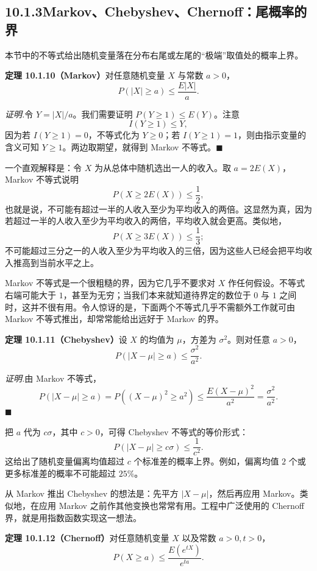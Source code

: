 \documentclass[UTF8,12pt,a4paper,fontset=fandol]{ctexart}
\begin{document}
\subsection*{10.1.3\quad Markov、Chebyshev、Chernoff：尾概率的界}

本节中的不等式给出随机变量落在分布右尾或左尾的“极端”取值处的概率上界。

\noindent\textbf{定理 10.1.10（Markov）}\quad 对任意随机变量 $X$ 与常数 $a>0$，
\[
  P(|X|\ge a)\le \frac{E|X|}{a}.
\]

\noindent\textit{证明.}\quad 令 $Y=|X|/a$。我们需要证明 $P(Y\ge 1)\le E(Y)$。注意
\[
  I(Y\ge 1)\le Y,
\]
因为若 $I(Y\ge 1)=0$，不等式化为 $Y\ge 0$；若 $I(Y\ge 1)=1$，则由指示变量的含义可知 $Y\ge 1$。两边取期望，就得到 Markov 不等式。$\blacksquare$

一个直观解释是：令 $X$ 为从总体中随机选出一人的收入。取 $a=2E(X)$，Markov 不等式说明
\[
  P(X\ge 2E(X))\le \frac12,
\]
也就是说，不可能有超过一半的人收入至少为平均收入的两倍。这显然为真，因为若超过一半的人收入至少为平均收入的两倍，平均收入就会更高。类似地，
\[
  P(X\ge 3E(X))\le \frac13;
\]
不可能超过三分之一的人收入至少为平均收入的三倍，因为这些人已经会把平均收入推高到当前水平之上。

Markov 不等式是一个很粗糙的界，因为它几乎不要求对 $X$ 作任何假设。不等式右端可能大于 $1$，甚至为无穷；当我们本来就知道待界定的数位于 $0$ 与 $1$ 之间时，这并不很有用。令人惊讶的是，下面两个不等式几乎不需额外工作就可由 Markov 不等式推出，却常常能给出远好于 Markov 的界。

\noindent\textbf{定理 10.1.11（Chebyshev）}\quad 设 $X$ 的均值为 $\mu$，方差为 $\sigma^2$。则对任意 $a>0$，
\[
  P(|X-\mu|\ge a)\le \frac{\sigma^2}{a^2}.
\]

\noindent\textit{证明.}\quad 由 Markov 不等式，
\[
  P(|X-\mu|\ge a)=P((X-\mu)^2\ge a^2)
  \le \frac{E(X-\mu)^2}{a^2}
  =\frac{\sigma^2}{a^2}.
\]
$\blacksquare$

把 $a$ 代为 $c\sigma$，其中 $c>0$，可得 Chebyshev 不等式的等价形式：
\[
  P(|X-\mu|\ge c\sigma)\le \frac{1}{c^2}.
\]
这给出了随机变量偏离均值超过 $c$ 个标准差的概率上界。例如，偏离均值 $2$ 个或更多标准差的概率不可能超过 $25\%$。

从 Markov 推出 Chebyshev 的想法是：先平方 $|X-\mu|$，然后再应用 Markov。类似地，在应用 Markov 之前作其他变换也常常有用。工程中广泛使用的 Chernoff 界，就是用指数函数实现这一想法。

\noindent\textbf{定理 10.1.12（Chernoff）}\quad 对任意随机变量 $X$ 以及常数 $a>0,t>0$，
\[
  P(X\ge a)\le \frac{E(e^{tX})}{e^{ta}}.
\]
\end{document}
